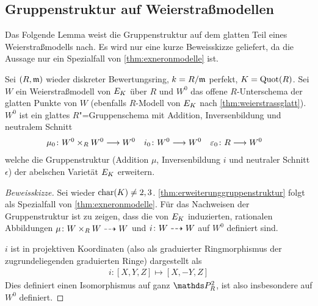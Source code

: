 \subsection{Gruppenstruktur auf Weierstraßmodellen}
Das Folgende Lemma weist die Gruppenstruktur auf dem glatten Teil
eines Weierstraßmodells nach. Es wird nur eine kurze Beweisskizze
geliefert, da die Aussage nur ein Spezialfall von
\ref{thm:exneronmodelle} ist.
\begin{Lemma}\label{thm:erweiterunggruppenstruktur}
  Sei $(R,\mathfrak{m})$ wieder diskreter Bewertungsring,
  $k=R/\mathfrak{m}$ perfekt,
  $K=\operatorname{Quot}(R)$.
  Sei $W$ ein Weierstraßmodell von $E_{K}$ über $R$ und
  $W^0$ das offene $R$-Unterschema der glatten Punkte von $W$ 
  (ebenfalls $R$-Modell von $E_{K}$ nach \ref{thm:weierstrassglatt}).
  $W^0$ ist ein glattes $R$"=Gruppenschema
  mit Addition, Inversenbildung und neutralem Schnitt
  \begin{align*}
    \mu_0\colon W^0\times_R W^0 &\longrightarrow W^0
    &i_0\colon W^0&\longrightarrow W^0
    &\varepsilon_0\colon R&\longrightarrow W^0
  \end{align*}
  welche die Gruppenstruktur (Addition $\mu$, Inversenbildung $i$ und
  neutraler Schnitt $\epsilon$)
  der abelschen Varietät $E_{K}$ erweitern.

  
  \begin{proof}[Beweisskizze] Sei wieder $\operatorname{char}(K)\neq 2,3$.
    \ref{thm:erweiterunggruppenstruktur} folgt als Spezialfall von
    \ref{thm:exneronmodelle}.
    Für das Nachweisen der Gruppenstruktur ist zu zeigen, dass die von
    $E_{K}$ induzierten, rationalen Abbildungen $\mu\colon W\times_R
    W\dashrightarrow W$ und $i\colon W\dashrightarrow W$ auf $W^0$ definiert sind.

    $i$ ist in projektiven Koordinaten (also als graduierter
    Ringmorphismus der zugrundeliegenden graduierten Ringe)
    dargestellt als
    \begin{gather*}
      i\colon [X,Y,Z]\mapsto [X,-Y,Z]
    \end{gather*}
    Dies definiert einen Isomorphismus auf ganz $\P_R^2$, ist also
    insbesondere auf $W^0$ definiert.


\end{proof}
\end{Lemma}
